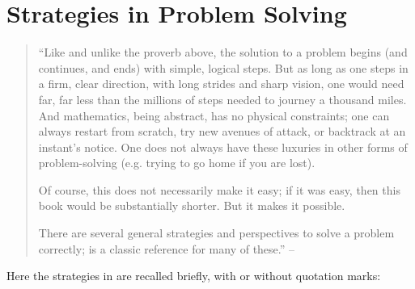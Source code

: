 \documentclass[oneside]{book}
\numberwithin{equation}{section}
\begin{document}
\section{Strategies in Problem Solving}
\begin{quotation}
	``Like and unlike the proverb above, the solution to a problem begins (and continues, and ends) with simple, logical steps. But as long as one steps in a firm, clear direction, with long strides and sharp vision, one would need far, far less than the millions of steps needed to journey a thousand miles. And mathematics, being abstract, has no physical constraints; one can always restart from scratch, try new avenues of attack, or backtrack at an instant's notice. One does not always have these luxuries in other forms of problem-solving (e.g. trying to go home if you are lost).
	
	Of course, this does not necessarily make it easy; if it was easy, then this book would be substantially shorter. But it makes it possible.
	
	There are several general strategies and perspectives to solve a problem correctly; \cite{Polya2014} is a classic reference for many of these.'' -- \cite[Chap. 1, p. 1]{Tao2006}
\end{quotation}
Here the strategies in \cite[Chap. 1, pp. 1--7]{Tao2006} are recalled briefly, with or without quotation marks:
\end{document}
